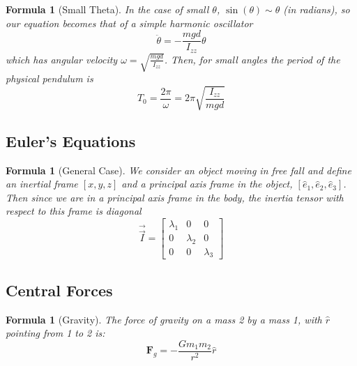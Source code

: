 \documentclass[12pt]{article}
\newtheorem{for}[thm]{Formula}
\theoremstyle{definition}
\theoremstyle{remark}
\numberwithin{equation}{section}
\newcommand\B[1]{\textbf{#1}}
\begin{document}
\begin{for}[Small Theta]
        In the case of small $\theta$, $\sin(\theta) \sim \theta$ (in radians), so our equation becomes that of a simple harmonic oscillator \begin{equation}
                \ddot{\theta} = -\frac{mgd}{I_{zz}}\theta
        \end{equation}
        which has angular velocity $\omega = \sqrt{\frac{mgd}{I_{zz}}}$. Then, for small angles the period of the physical pendulum is \begin{equation}
                T_0 = \frac{2\pi}{\omega} = 2\pi\sqrt{\frac{I_{zz}}{mgd}}
        \end{equation}
\end{for}



\vspace{15pt}


\subsection{Euler's Equations}

\begin{for}[General Case]
        We consider an object moving in free fall and define an inertial frame $[x,y,z]$ and a principal axis frame in the object, $[\hat{e}_1,\hat{e}_2,\hat{e}_3]$. Then since we are in a principal axis frame in the body, the inertia tensor with respect to this frame is diagonal \begin{equation}
                \vec{\vec{I}} = \begin{bmatrix} \lambda_1 & 0 & 0 \\ 0 & \lambda_2 & 0 \\ 0 & 0 & \lambda_3 \end{bmatrix}
        \end{equation}
\end{for}



\subsection{Central Forces}

\begin{for}[Gravity]
        The force of gravity on a mass 2 by a mass 1, with $\hat{r}$ pointing from 1 to 2 is:
        \begin{equation}
                \B{F}_g = -\frac{Gm_1m_2}{r^2}\hat{r}
        \end{equation}
\end{for}
\end{document}
